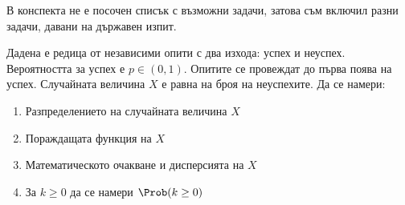 \documentclass[numbers=endperiod, bibliography=totocnumbered]{scrartcl}
\begin{document}
В конспекта не е посочен списък с възможни задачи, затова съм включил разни задачи, давани на държавен изпит.

\begin{exercise}\label{ex:se_summer2014}
  Дадена е редица от независими опити с два изхода: успех и неуспех. Вероятността за успех е \( p \in (0, 1) \). Опитите се провеждат до първа поява на успех. Случайната величина \( X \) е равна на броя на неуспехите. Да се намери:
  \begin{enumerate}[label=\alph*)]
    \item Разпределението на случайната величина \( X \)
    \item Пораждащата функция на \( X \)
    \item Математическото очакване и дисперсията на \( X \)
    \item За \( k \geq 0 \) да се намери \( \Prob(k \geq 0) \)
  \end{enumerate}
\end{exercise}
\end{document}
